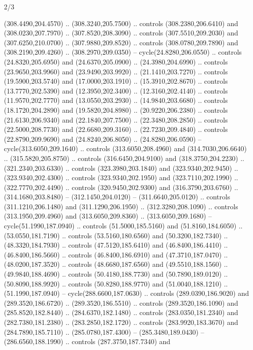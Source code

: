 \begin{flagdescription}{2/3}
\begin{scope}[xshift=0.5\flaglength,yshift=0.5\flagwidth,scale=\stretchfactor]
\begin{scope}[scale=0.001645\flagwidth,yshift=65mm,xshift=-63mm]
\begin{scope}[y=0.80pt, x=0.80pt, yscale=-1,]
\begin{scope}[cm={{1.33333,0.0,0.0,1.33333,(0.0,1e-05)}}]
  (308.4490,204.4570) .. (308.3240,205.7500) .. controls (308.2380,206.6410) and
  (308.0230,207.7970) .. (307.8520,208.3090) .. controls (307.5510,209.2030) and
  (307.6250,210.0700) .. (307.9880,209.8520) .. controls (308.0780,209.7890) and
  (308.2190,209.4260) .. (308.2970,209.0350) -- cycle(24.8280,206.0550) ..
  controls (24.8320,205.6950) and (24.6370,205.0900) .. (24.3980,204.6990) ..
  controls (23.9650,203.9960) and (23.9490,203.9920) .. (21.1410,203.7270) ..
  controls (19.5900,203.5740) and (17.0000,203.1910) .. (15.3910,202.8670) ..
  controls (13.7770,202.5390) and (12.3950,202.3400) .. (12.3160,202.4140) ..
  controls (11.9570,202.7770) and (13.0550,203.2930) .. (14.9840,203.6680) ..
  controls (18.1720,204.2890) and (19.5820,204.8980) .. (20.9220,206.2380) ..
  controls (21.6130,206.9340) and (22.1840,207.7500) .. (22.3480,208.2850) ..
  controls (22.5000,208.7730) and (22.6680,209.3160) .. (22.7230,209.4840) ..
  controls (22.8790,209.9690) and (24.8240,206.8050) .. (24.8280,206.0590) --
  cycle(313.6050,209.1640) .. controls (313.6050,208.4960) and
  (314.7030,206.6640) .. (315.5820,205.8750) .. controls (316.6450,204.9100) and
  (318.3750,204.2230) .. (321.2340,203.6330) .. controls (323.3980,203.1840) and
  (323.9340,202.9450) .. (323.9340,202.4300) .. controls (323.9340,202.1950) and
  (323.7110,202.1990) .. (322.7770,202.4490) .. controls (320.9450,202.9300) and
  (316.3790,203.6760) .. (314.1680,203.8480) -- (312.1450,204.0120) --
  (311.6640,205.0120) .. controls (311.1210,206.1480) and (311.1290,206.1950) ..
  (312.3280,208.1090) .. controls (313.1950,209.4960) and (313.6050,209.8360) ..
  (313.6050,209.1680) -- cycle(51.1990,187.0940) .. controls (51.5000,185.5160)
  and (51.8160,184.6050) .. (53.0550,181.7190) .. controls (53.5160,180.6560)
  and (50.3200,182.7340) .. (48.3320,184.7930) .. controls (47.5120,185.6410)
  and (46.8400,186.4410) .. (46.8400,186.5660) .. controls (46.8400,186.6910)
  and (47.3710,187.0470) .. (48.0200,187.3520) .. controls (48.6680,187.6560)
  and (49.5510,188.1560) .. (49.9840,188.4690) .. controls (50.4180,188.7730)
  and (50.7890,189.0120) .. (50.8090,188.9920) .. controls (50.8280,188.9770)
  and (51.0040,188.1210) .. (51.1990,187.0940) -- cycle(288.6600,187.0630) ..
  controls (289.0390,186.9020) and (289.3520,186.6720) .. (289.3520,186.5510) ..
  controls (289.3520,186.1090) and (285.8520,182.8440) .. (284.6370,182.1480) ..
  controls (283.0350,181.2340) and (282.7380,181.2380) .. (283.2850,182.1720) ..
  controls (283.9920,183.3670) and (284.7890,185.7110) .. (285.0780,187.4300) --
  (285.3480,189.0430) -- (286.6560,188.1990) .. controls (287.3750,187.7340) and

\end{scope}
\end{scope}
\end{scope}
\end{scope}
\end{flagdescription}
